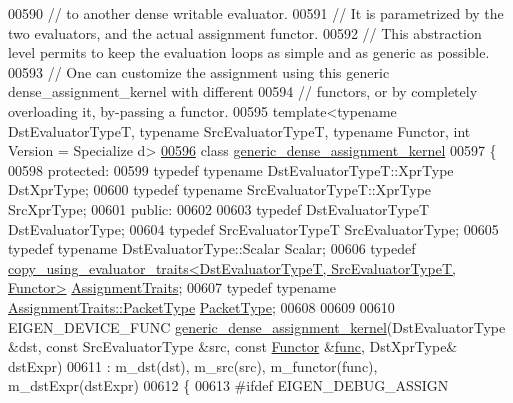 \begin{DoxyCode}
00590 \textcolor{comment}{// to another dense writable evaluator.}
00591 \textcolor{comment}{// It is parametrized by the two evaluators, and the actual assignment functor.}
00592 \textcolor{comment}{// This abstraction level permits to keep the evaluation loops as simple and as generic as possible.}
00593 \textcolor{comment}{// One can customize the assignment using this generic dense\_assignment\_kernel with different}
00594 \textcolor{comment}{// functors, or by completely overloading it, by-passing a functor.}
00595 \textcolor{keyword}{template}<\textcolor{keyword}{typename} DstEvaluatorTypeT, \textcolor{keyword}{typename} SrcEvaluatorTypeT, \textcolor{keyword}{typename} Functor, \textcolor{keywordtype}{int} Version = Specialize
      d>
\hyperlink{class_eigen_1_1internal_1_1generic__dense__assignment__kernel}{00596} \textcolor{keyword}{class }\hyperlink{class_eigen_1_1internal_1_1generic__dense__assignment__kernel}{generic\_dense\_assignment\_kernel}
00597 \{
00598 \textcolor{keyword}{protected}:
00599   \textcolor{keyword}{typedef} \textcolor{keyword}{typename} DstEvaluatorTypeT::XprType DstXprType;
00600   \textcolor{keyword}{typedef} \textcolor{keyword}{typename} SrcEvaluatorTypeT::XprType SrcXprType;
00601 \textcolor{keyword}{public}:
00602   
00603   \textcolor{keyword}{typedef} DstEvaluatorTypeT DstEvaluatorType;
00604   \textcolor{keyword}{typedef} SrcEvaluatorTypeT SrcEvaluatorType;
00605   \textcolor{keyword}{typedef} \textcolor{keyword}{typename} DstEvaluatorType::Scalar Scalar;
00606   \textcolor{keyword}{typedef} 
      \hyperlink{struct_eigen_1_1internal_1_1copy__using__evaluator__traits}{copy\_using\_evaluator\_traits<DstEvaluatorTypeT, SrcEvaluatorTypeT, Functor>}
       \hyperlink{struct_eigen_1_1internal_1_1copy__using__evaluator__traits}{AssignmentTraits};
00607   \textcolor{keyword}{typedef} \textcolor{keyword}{typename} \hyperlink{class_eigen_1_1internal_1_1_tensor_lazy_evaluator_writable}{AssignmentTraits::PacketType} 
      \hyperlink{class_eigen_1_1internal_1_1_tensor_lazy_evaluator_writable}{PacketType};
00608   
00609   
00610   EIGEN\_DEVICE\_FUNC \hyperlink{class_eigen_1_1internal_1_1generic__dense__assignment__kernel}{generic\_dense\_assignment\_kernel}(DstEvaluatorType &dst, \textcolor{keyword}{
      const} SrcEvaluatorType &src, \textcolor{keyword}{const} \hyperlink{struct_functor}{Functor} &\hyperlink{structfunc}{func}, DstXprType& dstExpr)
00611     : m\_dst(dst), m\_src(src), m\_functor(func), m\_dstExpr(dstExpr)
00612   \{
00613 \textcolor{preprocessor}{    #ifdef EIGEN\_DEBUG\_ASSIGN}

\end{DoxyCode}
